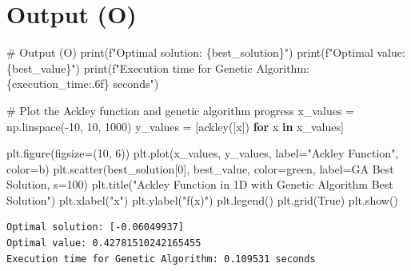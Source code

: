 \documentclass[
  letterpaper,
  DIV=11,
  numbers=noendperiod]{scrreprt}
\newenvironment{Shaded}{\begin{snugshade}}{\end{snugshade}}
\newcommand{\BuiltInTok}[1]{\textcolor[rgb]{0.00,0.23,0.31}{#1}}
\newcommand{\CommentTok}[1]{\textcolor[rgb]{0.37,0.37,0.37}{#1}}
\newcommand{\ControlFlowTok}[1]{\textcolor[rgb]{0.00,0.23,0.31}{\textbf{#1}}}
\newcommand{\DecValTok}[1]{\textcolor[rgb]{0.68,0.00,0.00}{#1}}
\newcommand{\KeywordTok}[1]{\textcolor[rgb]{0.00,0.23,0.31}{\textbf{#1}}}
\newcommand{\NormalTok}[1]{\textcolor[rgb]{0.00,0.23,0.31}{#1}}
\newcommand{\OperatorTok}[1]{\textcolor[rgb]{0.37,0.37,0.37}{#1}}
\newcommand{\SpecialCharTok}[1]{\textcolor[rgb]{0.37,0.37,0.37}{#1}}
\newcommand{\SpecialStringTok}[1]{\textcolor[rgb]{0.13,0.47,0.30}{#1}}
\newcommand{\StringTok}[1]{\textcolor[rgb]{0.13,0.47,0.30}{#1}}
\newcommand{\VariableTok}[1]{\textcolor[rgb]{0.07,0.07,0.07}{#1}}
\begin{document}
\section{Output (O)}\label{output-o}

\begin{Shaded}
\begin{Highlighting}[]
\CommentTok{\# Output (O)}
\BuiltInTok{print}\NormalTok{(}\SpecialStringTok{f"Optimal solution: }\SpecialCharTok{\{}\NormalTok{best\_solution}\SpecialCharTok{\}}\SpecialStringTok{"}\NormalTok{)}
\BuiltInTok{print}\NormalTok{(}\SpecialStringTok{f"Optimal value: }\SpecialCharTok{\{}\NormalTok{best\_value}\SpecialCharTok{\}}\SpecialStringTok{"}\NormalTok{)}
\BuiltInTok{print}\NormalTok{(}\SpecialStringTok{f"Execution time for Genetic Algorithm: }\SpecialCharTok{\{}\NormalTok{execution\_time}\SpecialCharTok{:.6f\}}\SpecialStringTok{ seconds"}\NormalTok{)}

\CommentTok{\# Plot the Ackley function and genetic algorithm progress}
\NormalTok{x\_values }\OperatorTok{=}\NormalTok{ np.linspace(}\OperatorTok{{-}}\DecValTok{10}\NormalTok{, }\DecValTok{10}\NormalTok{, }\DecValTok{1000}\NormalTok{)}
\NormalTok{y\_values }\OperatorTok{=}\NormalTok{ [ackley([x]) }\ControlFlowTok{for}\NormalTok{ x }\KeywordTok{in}\NormalTok{ x\_values]}

\NormalTok{plt.figure(figsize}\OperatorTok{=}\NormalTok{(}\DecValTok{10}\NormalTok{, }\DecValTok{6}\NormalTok{))}
\NormalTok{plt.plot(x\_values, y\_values, label}\OperatorTok{=}\StringTok{"Ackley Function"}\NormalTok{, color}\OperatorTok{=}\StringTok{\textquotesingle{}b\textquotesingle{}}\NormalTok{)}
\NormalTok{plt.scatter(best\_solution[}\DecValTok{0}\NormalTok{], best\_value, color}\OperatorTok{=}\StringTok{\textquotesingle{}green\textquotesingle{}}\NormalTok{, label}\OperatorTok{=}\StringTok{\textquotesingle{}GA Best Solution\textquotesingle{}}\NormalTok{, s}\OperatorTok{=}\DecValTok{100}\NormalTok{)}
\NormalTok{plt.title(}\StringTok{"Ackley Function in 1D with Genetic Algorithm Best Solution"}\NormalTok{)}
\NormalTok{plt.xlabel(}\StringTok{"x"}\NormalTok{)}
\NormalTok{plt.ylabel(}\StringTok{"f(x)"}\NormalTok{)}
\NormalTok{plt.legend()}
\NormalTok{plt.grid(}\VariableTok{True}\NormalTok{)}
\NormalTok{plt.show()}
\end{Highlighting}
\end{Shaded}

\begin{verbatim}
Optimal solution: [-0.06049937]
Optimal value: 0.42781510242165455
Execution time for Genetic Algorithm: 0.109531 seconds
\end{verbatim}
\end{document}
